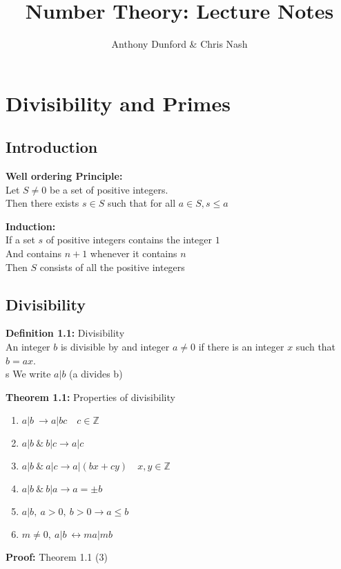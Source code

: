\documentclass[a4paper]{article}
\title{Number Theory: Lecture Notes}
\author{Anthony Dunford & Chris Nash}
\begin{document}
\maketitle

\section{Divisibility and Primes}

\subsection{Introduction}

\textbf{Well ordering Principle:}\\
Let $S\neq0$ be a set of positive integers.\\
Then there exists $s\in S$ such that for all $a\in S, s\leq a$

\textbf{Induction:}\\
If a set $s$ of positive integers contains the integer $1$\\
And contains $n+1$ whenever it contains $n$\\
Then $S$ consists of all the positive integers

\subsection{Divisibility}

\textbf{Definition 1.1:} Divisibility\\
An integer $b$ is divisible by and integer $a\neq0$ if there is an integer
$x$ such that $b=ax$.\\s
We write $a|b$ (a divides b)

\textbf{Theorem 1.1:} Properties of divisibility
\begin{enumerate}
    \item $a|b\            \rightarrow a|bc\quad c\in \mathbb{Z}$
    \item $a|b\ \&\ b|c    \rightarrow a|c$
    \item $a|b\ \&\ a|c    \rightarrow a|(bx+cy)\quad x,y\in\mathbb{Z}$
    \item $a|b\ \&\ b|a    \rightarrow a=\pm b$
    \item $a|b,\ a>0,\ b>0 \rightarrow a\leq b$
    \item $m\neq0,\ a|b\   \leftrightarrow ma|mb$
\end{enumerate}

\textbf{Proof:} Theorem 1.1 (3)
\end{document}
